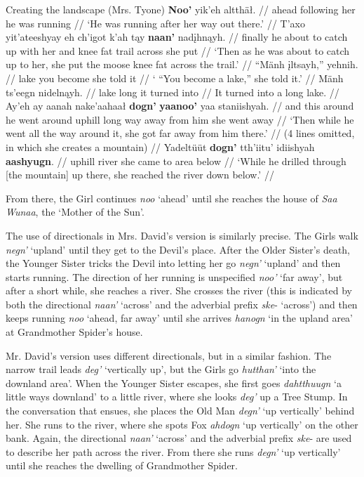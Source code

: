\pex Creating the landscape (Mrs. Tyone) 
\a
\begingl
\gla \textbf{Noo’} yik’eh altthäł.  //
\glb ahead {following her} {he was running} //
\glft `He was running after her way out there.' //
\endgl
\a
\begingl
\gla T’axo yit'ateeshyay eh ch’igot k’ah tąy \textbf{naan’} nadįhnąyh.  //
\glb finally {he about to catch up with her} and knee fat trail across {she put} //
\glft `Then as he was about to catch up to her, she put the moose knee fat across the trail.' //
\endgl
\a
\begingl
\gla ``Mänh įltsayh,'' yehnih.  //
\glb lake {you become} {she told it} //
\glft ` “You become a lake,” she told it.' //
\endgl
\a
\begingl
\gla Mänh ts’eegn nidelnąyh.  //
\glb lake long {it turned into} //
\glft It turned into a long lake. //
\endgl
\a
\begingl
\gla Ay’eh ay aanah nake'aahaał \textbf{dogn’} \textbf{yaanoo’} yaa staniishyah.  //
\glb and this around {he went around} uphill {long way away} {from him} {she went away} //
\glft `Then while he went all the way around it, she got far away from him there.' //
\endgl
\a
\begingl
\gla (4 lines omitted, in which she creates a mountain) //
\endgl
\a
\begingl
\gla Yadeltüüt \textbf{dogn’} tth’iitu’ idiishyah \textbf{aashyugn}.  //
 {uphill} river {she came to} {area below} //
\glft `While he drilled through [the mountain] up there, she reached the river down below.' //
\endgl
\xe

From there, the Girl continues \textit{noo} `ahead' until she reaches the house of \textit{Saa Wunaa}, the `Mother of the Sun'.

The use of directionals in Mrs. David's version is similarly precise. The Girls walk {\em negn'} `upland' until they get to the Devil's place. After the Older Sister's death, the Younger Sister tricks the Devil into letting her go {\em negn'} `upland' and then starts running. The direction of her running is unspecified {\em noo'} `far away', but after a short while, she reaches a river. She crosses the river (this is indicated by both the directional {\em naan'} `across' and the adverbial prefix {\em ske}- `across') and then keeps running {\em noo} `ahead, far away' until she arrives \textit{hanogn} `in the upland area' at Grandmother Spider's house.

Mr. David's version uses different directionals, but in a similar fashion. The narrow trail leads {\em deg'} `vertically up', but the Girls go {\em hutthan'} `into the downland area'. When the Younger Sister escapes, she first goes {\em dahtthuugn} `a little ways downland' to a little river, where she looks {\em deg'} up a Tree Stump. In the conversation that ensues, she places the Old Man {\em degn'} `up vertically' behind her. She runs to the river, where she spots Fox {\em ahdogn} `up vertically' on the other bank. Again, the directional {\em naan'} `across' and the adverbial prefix {\em ske}- are used to describe her path across the river. From there she runs {\em degn'} `up vertically' until she reaches the dwelling of Grandmother Spider.

